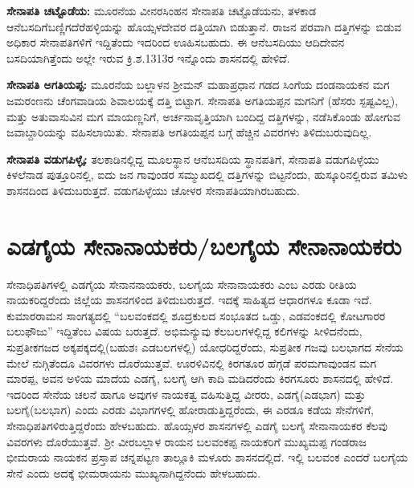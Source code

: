 \vskip 2pt

\textbf{ಸೇನಾಪತಿ ಚಟ್ಟೊಡೆಯ:} ಮೂರನೆಯ ವೀನರಸಿಂಹನ ಸೇನಾಪತಿ ಚಟ್ಟೊಡೆಯನು, ತಳಕಾಡ ಆನೆಬಸದಿಗೆ\break ಬಣ್ಣಿಗದೆರೆಹಳ್ಳಿಯನ್ನು ಹೊಯ್ಸಳದೇವರ ದತ್ತಿಯಾಗಿ ಬಿಡುತ್ತಾನೆ. ರಾಜನ ಪರವಾಗಿ ದತ್ತಿಗಳನ್ನು ಬಿಡುವ ಅಧಿಕಾರ ಸೇನಾಪತಿಗಳಿಗೆ ಇದ್ದಿತೆಂದು ಇದರಿಂದ ಊಹಿಸಬಹುದು. ಈ ಆನೆಬಸದಿಯು ಆದಿದೇವನ ಬಸದಿಯಾಗಿತ್ತೆಂದು ಅಲ್ಲೇ ಇರುವ ಕ್ರಿ.ಶ.1313ರ ಇನ್ನೊಂದು ಶಾಸನದಲ್ಲಿ ಹೇಳಿದೆ.

\vskip 2pt

\textbf{ಸೇನಾಪತಿ ಅಗತಿಯಪ್ಪ:} ಮೂರನೆಯ ಬಲ್ಲಾಳನ ಶ‍್ರೀಮನ್​ ಮಹಾಪ್ರಧಾನ ಗಡದ ಸಿಂಗೆಯ ದಂಡನಾಯಕನ ಮಗ ಜಮರಂಣನು ಚೆಂಗವಾಡಿಯ ಶಿವಾಲಯಕ್ಕೆ ದತ್ತಿ ಬಿಟ್ಟಾಗ. ಸೇನಾಪತಿ ಅಗತಿಯಪ್ಪನ ಮಗನಿಗೆ (ಹೆಸರು ಸ್ಪಷ್ಟವಿಲ್ಲ), ಮತ್ತು ಅತುವಾಸುವಿನ ಮಗ ಮಾಯಣ್ಣನಿಗೆ, ಅರ್ಚನಾವೃತ್ತಿಯಾಗಿ ಬಂದಿದ್ದ ದತ್ತಿಗಳನ್ನು, ನಡೆಸಿಕೊಂಡು ಹೋಗುವ ಜವಾಬ್ದಾರಿಯನ್ನು ವಹಿಸಲಾಯಿತು. ಸೇನಾಪತಿ ಅಗತಿಯಪ್ಪನ ಬಗ್ಗೆ ಹೆಚ್ಚಿನ ವಿವರಗಳು ತಿಳಿದುಬರುವುದಿಲ್ಲ.

\vskip 2pt

\textbf{ಸೇನಾಪತಿ ವಡುಗಪಿಳ್ಳೈ:} ತಲಕಾಡಿನಲ್ಲಿದ್ದ ಮೂಲಸ್ಥಾನ ಆನೆಬಸದಿಯ ಸ್ಥಾನಪತಿಗೆ, ಸೇನಾಪತಿ ವಡುಗಪಿಳ್ಳೆಯು ಕಿಳಲೆನಾಡ ಪುತ್ತೂರಿನಲ್ಲಿ, ಐದು ಜನ ಗಾವುಂಡರ ಸಮ್ಮುಖದಲ್ಲಿ ದತ್ತಿಗಳನ್ನು ಬಿಟ್ಟನೆಂದು, ಹುಸ್ಕೂರಿನಲ್ಲಿರುವ ತಮಿಳು ಶಾಸನದಿಂದ ತಿಳಿದುಬರುತ್ತದೆ. ವಡುಗಪಿಳ್ಳೆಯು ಚೋಳರ ಸೇನಾಪತಿಯಾಗಿರಬಹುದು.


\section{ಎಡಗೈಯ ಸೇನಾನಾಯಕರು/ಬಲಗೈಯ ಸೇನಾನಾಯಕರು}

ಸೇನಾಧಿಪತಿಗಳಲ್ಲಿ ಎಡಗೈಯ ಸೇನಾನನಾಯಕರು, ಬಲಗೈಯ ಸೇನಾನಾಯಕರು ಎಂಬ ಎರಡು ರೀತಿಯ ನಾಯಕರಿದ್ದ\-ರೆಂದು ಜಿಲ್ಲೆಯ ಶಾಸನಗಳಿಂದ ತಿಳಿದುಬರುತ್ತದೆ. ಇದಕ್ಕೆ ಸಾಹಿತ್ಯದ ಆಧಾರಗಳೂ ಕೂಡಾ ಇದೆ. ಕುಮಾರರಾಮನ ಸಾಂಗತ್ಯದಲ್ಲಿ “ಬಲವಂಕದಲ್ಲಿ ಶೂದ್ರಕುಲದ ಸಂಭೂತದ ಒಡ್ಡು, ಎಡವಂಕದಲ್ಲಿ ಕೋಟಗಾರರ ಬಲುಫೌಜು” ಇದ್ದಿತೆಂಬ ವಿಷಯ ಬರುತ್ತದೆ. ಅಭಿಮನ್ಯುವು ಕೆಲಬಲಗಳಲ್ಲಿದ್ದ ಕಲಿಗಳನ್ನು ಸೀಳಿದನೆಂದು, ಸುಪ್ರತೀಕಗಜದ ಅಕ್ಕಪಕ್ಕದಲ್ಲಿ\break (ಬಹುಶಃ ಎಡಬಲಗಳಲ್ಲಿ) ಯೋಧರಿದ್ದರೆಂದು, ಸುಪ್ರತೀಕ ಗಜವು ಬಲಭಾಗದ ಸೇನೆಯ ಮೇಲೆ ನುಗ್ಗಿತೆಂದೂ ವಿವರಗಳು ದೊರೆಯುತ್ತವೆ. ಊರಳಿವಿನಲ್ಲಿ ಕಿರಗತೂರ ಹೆಗ್ಗಡೆ ಪರಮಗಾವುಂಡನ ಮಗ ಮಾರಪ್ಪ, ಅವನ ಅಳಿಯ ಮಾದೆಯ ಎಡಗೈ, ಬಲಗೈ ಆಗಿ ಕಾದಿ ಮಡಿದರೆಂದು ಕಿರಗಸೂರು ಶಾಸನದಲ್ಲಿ ಹೇಳಿದೆ. ಇದರಿಂದ ಸೇನೆಯ ಚಲನೆ ಹಾಗೂ ಅವುಗಳ ನಾಯಕತ್ವ ವಹಿಸುತ್ತಿದ್ದ ವೀರರು, ಎಡಗೈ(ಎಡಭಾಗ) ಮತ್ತು ಬಲಗೈ(ಬಲಭಾಗ) ಎಂದು ಎರಡು ವಿಭಾಗಗಳಲ್ಲಿ ಹೋರಾಡುತ್ತಿದ್ದರೆಂದು, ಈ ಎರಡೂ ಕಡೆಯ ಸೇನೆಗಳಿಗೆ, ಸೇನಾಧಿಪತಿಗಳಿರುತ್ತಿದ್ದರೆಂದು ಹೇಳಬಹುದು. ಹೊಯ್ಸಳರ ಶಾಸನಗಳಲ್ಲಿ ಎಡಗೈ ಬಲಗೈ ಸೇನಾನಾಯಕರ ಕೆಲವು ವಿವರಗಳು ದೊರೆಯುತ್ತವೆ. ಶ‍್ರೀ ವೀರಬಲ್ಲಾಳ ರಾಯನ ಬಲವಂಕಪ್ಪ ನಾಯಕರಿಗೆ ಮುಖ್ಯಮಪ್ಪ ಗಂಡರಾಜ ಭೀಮರಾಯ ನಾಯಕನ ಪ್ರಸ್ತಾಪ ಚನ್ನಪಟ್ಟಣ ತಾಲ್ಲೂಕಿ ಮಳೂರು ಶಾಸನದಲ್ಲಿದೆ. ಇಲ್ಲಿ ಬಲವಂಕ ಎಂದರೆ ಬಲಗೈಯ ಸೇನೆ ಎಂದು ಅದಕ್ಕೆ ಭೀಮರಾಯನು ಮುಖ್ಯನಾಗಿದ್ದನೆಂದು ಹೇಳಬಹುದು.

